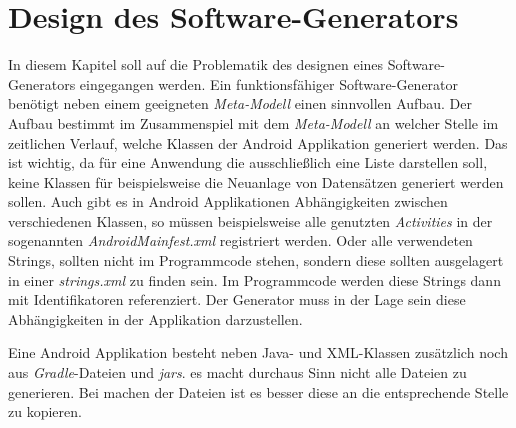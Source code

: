 \section{Design des Software-Generators}
In diesem Kapitel soll auf die Problematik des designen eines Software-Generators eingegangen werden. Ein funktionsfähiger Software-Generator benötigt neben einem geeigneten \textit{Meta-Modell} einen sinnvollen Aufbau. Der Aufbau bestimmt im Zusammenspiel mit dem \textit{Meta-Modell} an welcher Stelle im zeitlichen Verlauf, welche Klassen der Android Applikation generiert werden. Das ist wichtig, da für eine Anwendung die ausschließlich eine Liste darstellen soll, keine Klassen für beispielsweise die Neuanlage von Datensätzen generiert werden sollen. 
Auch gibt es in Android Applikationen Abhängigkeiten zwischen verschiedenen Klassen, so müssen beispielsweise alle genutzten \textit{Activities} in der sogenannten \textit{AndroidMainfest.xml} registriert werden. Oder alle verwendeten Strings, sollten nicht im Programmcode stehen, sondern diese sollten ausgelagert in einer \textit{strings.xml} zu finden sein. Im Programmcode werden diese Strings dann mit Identifikatoren referenziert. Der Generator muss in der Lage sein diese Abhängigkeiten in der Applikation darzustellen. 

Eine Android Applikation besteht neben Java- und XML-Klassen zusätzlich noch aus \textit{Gradle}-Dateien und \textit{\acfp{jar}}. es macht durchaus Sinn nicht alle Dateien zu generieren. Bei machen der Dateien ist es besser diese an die entsprechende Stelle zu kopieren.

